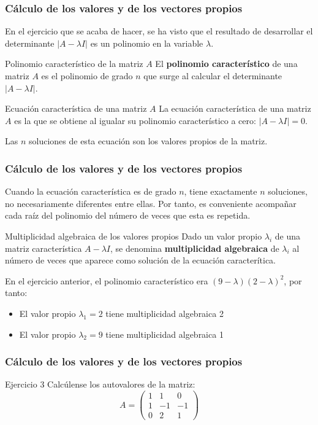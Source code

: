 \documentclass{beamer}
\begin{document}
\begin{frame}
\frametitle{C\'alculo de los valores y de los vectores propios}
En el ejercicio que se acaba de hacer, se ha visto que el resultado de desarrollar el determinante $|A-\lambda I |$ es un polinomio en la variable $\lambda$.
\begin{block}{Polinomio caracter\'istico de la matriz $A$}
El \textbf{polinomio caracter\'istico} de una matriz $A$ es el polinomio de grado $n$ que surge al calcular el determinante $|A-\lambda I|$.
\end{block}
\begin{block}{Ecuaci\'on caracter\'istica de una matriz $A$}
La ecuaci\'on caracter\'istica de una matriz $A$ es la que se obtiene al igualar su polinomio caracter\'istico a cero: $|A-\lambda I | = 0$.

Las $n$ soluciones de esta ecuaci\'on son los valores propios de la matriz. 
\end{block}
\end{frame}


\begin{frame}
\frametitle{C\'alculo de los valores y de los vectores propios}
Cuando la ecuaci\'on caracter\'istica es de grado $n$, tiene exactamente $n$ soluciones, no necesariamente diferentes entre ellas. Por tanto, es conveniente acompa\~nar cada ra\'iz del polinomio del n\'umero de veces que esta es repetida. 
\begin{block}{Multiplicidad algebraica de los valores propios}
Dado un valor propio $\lambda_i$ de una matriz caracter\'istica $A-\lambda I$, se denomina \textbf{multiplicidad algebraica} de $\lambda_i$ al n\'umero de veces que aparece como soluci\'on de la ecuaci\'on caracter\'itica.
\end{block}
En el ejercicio anterior, el polinomio caracter\'istico era $(9-\lambda)(2-\lambda)^2$, por tanto:
\begin{itemize}
\item El valor propio $\lambda_1=2$ tiene multiplicidad algebraica 2
\item El valor propio $\lambda_2=9$ tiene multiplicidad algebraica 1
\end{itemize}
\end{frame}

\begin{frame}
\frametitle{C\'alculo de los valores y de los vectores propios}
\begin{block}{Ejercicio 3}
Calc\'ulense los autovalores de la matriz:
\[A=\left(\begin{array}{rrr}1 & 1 & 0 \\1 & -1 & -1 \\0 & 2 & 1\end{array}\right)\]
\end{block}
\end{frame}
\end{document}

